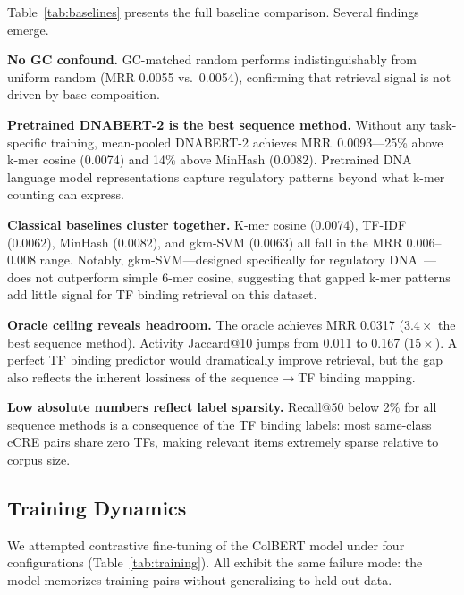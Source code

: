 \documentclass[10pt,twocolumn]{article}
\begin{document}
Table~\ref{tab:baselines} presents the full baseline comparison. Several findings emerge.

\textbf{No GC confound.}
GC-matched random performs indistinguishably from uniform random (MRR 0.0055 vs.\ 0.0054), confirming that retrieval signal is not driven by base composition.

\textbf{Pretrained DNABERT-2 is the best sequence method.}
Without any task-specific training, mean-pooled DNABERT-2 achieves MRR~0.0093---25\% above k-mer cosine (0.0074) and 14\% above MinHash (0.0082). Pretrained DNA language model representations capture regulatory patterns beyond what k-mer counting can express.

\textbf{Classical baselines cluster together.}
K-mer cosine (0.0074), TF-IDF (0.0062), MinHash (0.0082), and gkm-SVM (0.0063) all fall in the MRR 0.006--0.008 range. Notably, gkm-SVM---designed specifically for regulatory DNA~\citep{ghandi2014gkmsvm}---does not outperform simple 6-mer cosine, suggesting that gapped k-mer patterns add little signal for TF binding retrieval on this dataset.

\textbf{Oracle ceiling reveals headroom.}
The oracle achieves MRR 0.0317 ($3.4{\times}$ the best sequence method). Activity Jaccard@10 jumps from 0.011 to 0.167 ($15{\times}$). A perfect TF binding predictor would dramatically improve retrieval, but the gap also reflects the inherent lossiness of the sequence$\rightarrow$TF binding mapping.

\textbf{Low absolute numbers reflect label sparsity.}
Recall@50 below 2\% for all sequence methods is a consequence of the TF binding labels: most same-class cCRE pairs share zero TFs, making relevant items extremely sparse relative to corpus size.

\subsection{Training Dynamics}
\label{sec:training}

We attempted contrastive fine-tuning of the ColBERT model under four configurations (Table~\ref{tab:training}). All exhibit the same failure mode: the model memorizes training pairs without generalizing to held-out data.
\end{document}
